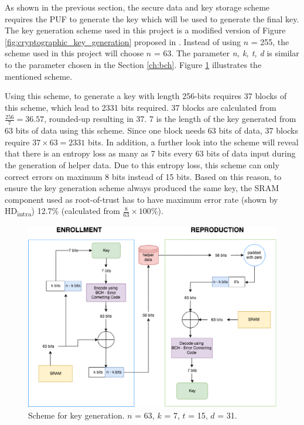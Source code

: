 As shown in the previous section, the secure data and key storage scheme requires the PUF to generate the key which will be used to generate the final key. The key generation scheme used in this project is a modified version of Figure \ref{fig:cryptographic_key_generation} proposed in \cite{cryptographic_key_generation}. Instead of using $n$ = 255, the scheme used in this project will choose $n$ = 63. The parameter \textit{n, k, t, d} is similar to the parameter chosen in the Section \ref{ch:bch}. Figure \ref{fig:key-generation-scheme} illustrates the mentioned scheme.

Using this scheme, to generate a key with length 256-bits requires 37 blocks of this scheme, which lead to 2331 bits required. 37 blocks are calculated from $\frac{256}{7}=36.57$, rounded-up resulting in 37. 7 is the length of the key generated from 63 bits of data using this scheme. Since one block needs 63 bits of data, 37 blocks require $37\times63=2331$ bits.
In addition, a further look into the scheme will reveal that there is an entropy loss as many as 7 bits every 63 bits of data input during the generation of helper data. Due to this entropy loss, this scheme can only correct errors on maximum 8 bits instead of 15 bits. Based on this reason, to ensure the key generation scheme always produced the same key, the SRAM component used as root-of-trust has to have maximum error rate (shown by HD\textsubscript{intra}) 12.7\% (calculated from $\frac{8}{63}\times100\%$).

\begin{figure}[tph!]
    \centerline{\includegraphics[width={\textwidth}]{images/key}}
    \caption{Scheme for key generation. $n$ = 63, $k$ = 7, $t$ = 15, $d$ = 31.}
    \label{fig:key-generation-scheme}
\end{figure}


